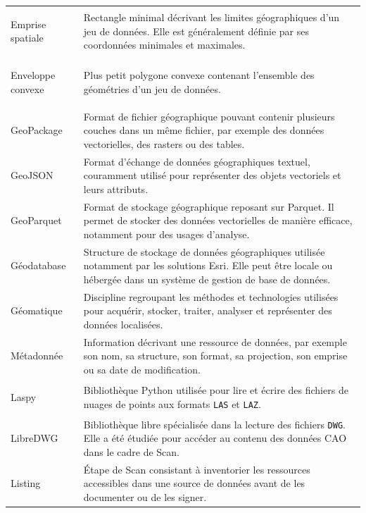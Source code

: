 \begin{longtable}{
    @{}
    >{\bfseries\raggedright\arraybackslash}p{}
    >{\raggedright\arraybackslash}p{}
    @{}
}
Emprise spatiale
&
Rectangle minimal décrivant les limites géographiques d'un jeu de données. Elle
est généralement définie par ses coordonnées minimales et maximales.
\\

Enveloppe convexe
&
Plus petit polygone convexe contenant l'ensemble des géométries d'un jeu de
données.
\\

GeoPackage
&
Format de fichier géographique pouvant contenir plusieurs couches dans un même
fichier, par exemple des données vectorielles, des rasters ou des tables.
\\

GeoJSON
&
Format d'échange de données géographiques textuel, couramment utilisé pour
représenter des objets vectoriels et leurs attributs.
\\

GeoParquet
&
Format de stockage géographique reposant sur Parquet. Il permet de stocker des
données vectorielles de manière efficace, notamment pour des usages d'analyse.
\\

Géodatabase
&
Structure de stockage de données géographiques utilisée notamment par les
solutions Esri. Elle peut être locale ou hébergée dans un système de gestion de
base de données.
\\

Géomatique
&
Discipline regroupant les méthodes et technologies utilisées pour acquérir,
stocker, traiter, analyser et représenter des données localisées.
\\

Métadonnée
&
Information décrivant une ressource de données, par exemple son nom, sa
structure, son format, sa projection, son emprise ou sa date de modification.
\\

Laspy
&
Bibliothèque Python utilisée pour lire et écrire des fichiers de nuages de
points aux formats \texttt{LAS} et \texttt{LAZ}.
\\

LibreDWG
&
Bibliothèque libre spécialisée dans la lecture des fichiers \texttt{DWG}. Elle a
été étudiée pour accéder au contenu des données CAO dans le cadre de Scan.
\\

Listing
&
Étape de Scan consistant à inventorier les ressources accessibles dans une
source de données avant de les documenter ou de les signer.
\\


\end{longtable}
